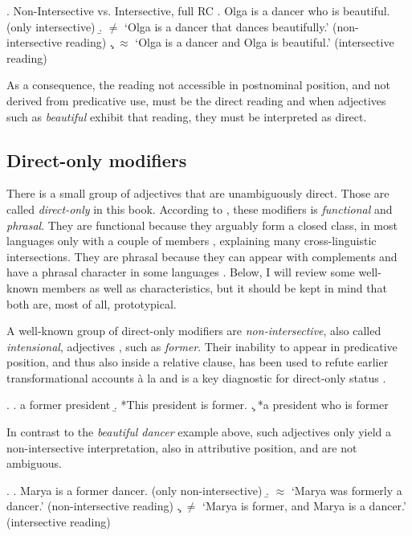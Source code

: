 \documentclass [output=book,colorlinks,citecolor=brown]{langscibook}
\begin{document}
\ex. Non-Intersective vs. Intersective, full RC \citep[9]{cinque:2010:adj}
\a. Olga is a dancer who is beautiful. (only intersective)
\b. $\neq$ `Olga is a dancer that dances beautifully.’ (non-intersective reading)
\c. $\approx$ `Olga is a dancer and Olga is beautiful.’ (intersective reading)

As a consequence, the reading not accessible in postnominal position, and not derived from predicative use, must be the direct reading and when adjectives such as \textit{beautiful} exhibit that reading, they must be interpreted as direct.

\subsection{Direct-only modifiers}

There is a small group of adjectives that are unambiguously direct. Those are called \textit{direct-only} in this book. According to \citet[ch. 4.1]{cinque:2010:adj}, these modifiers is \textit{functional} and \textit{phrasal}. They are functional because they arguably form a closed class, in most languages only with a couple of members \citep[43–44]{cinque:2010:adj}, explaining many cross-linguistic intersections. They are phrasal because they can appear with complements and have a phrasal character in some languages \citep[44–49]{cinque:2010:adj}. Below, I will review some well-known members as well as characteristics, but it should be kept in mind that both are, most of all, prototypical. %

A well-known group of direct-only modifiers are \textit{non-intersective}, also called \textit{intensional}, adjectives \citep{kamp:1995:prototype, panayidou:2013:in}, such as \textit{former}. Their inability to appear in predicative position, and thus also inside a relative clause, has been used to refute earlier transformational accounts à la \citet{smith:1964:det} and is a key diagnostic for direct-only status .

\ex. \a. a former president
\b. *This president is former.
\c. *a president who is former

In contrast to the \textit{beautiful dancer} example above, such adjectives only yield a non-intersective interpretation, also in attributive position, and are not ambiguous. %


\ex. \a. Marya is a former dancer. (only non-intersective)
\b. $\approx$ `Marya was formerly a dancer.’ (non-intersective reading)
\c. $\neq$ `Marya is former, and Marya is a dancer.’ (intersective reading) \\ \null\hfill \citep[304]{alex:2007:nounphrase}
\end{document}
